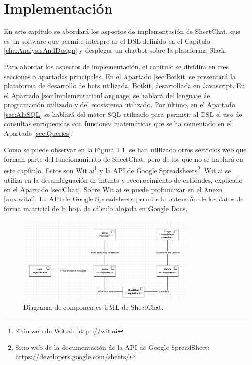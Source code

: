 \chapter{Implementación}
\label{cha:Implementation}

En este capítulo se abordará los aspectos de implementación de SheetChat, que es un software que permite interpretar el DSL definido en el Capítulo \ref{cha:AnalysisAndDesign} y desplegar un chatbot sobre la plataforma Slack.

Para abordar los aspectos de implementación, el capítulo se dividirá en tres secciones o apartados principales. En el Apartado \ref{sec:Botkit} se presentará la plataforma de desarrollo de bots utilizada, Botkit, desarrollada en Javascript. En el Apartado \ref{sec:ImplementationLanguage} se hablará del lenguaje de programación utilizado y del ecosistema utilizado. Por último, en el Apartado \ref{sec:AlaSQL} se hablará del motor SQL utilizado para permitir al DSL el uso de consultas enriquecidas con funciones matemáticas que se ha comentado en el Apartado \ref{sec:Queries}.

Como se puede observar en la Figura \ref{fig:UMLComponents}, se han utilizado otros servicios web que forman parte del funcionamiento de SheetChat, pero de los que no se hablará en este capítulo. Estos son Wit.ai\footnote{Sitio web de Wit.ai: \url{https://wit.ai}} y la API de Google Spreadsheets\footnote{Sitio web de la documentación de la API de Google SpreadSheet: \url{https://developers.google.com/sheets/}}. Wit.ai se utiliza en la desambiguación de intents y reconocimiento de entidades, explicado en el Apartado \ref{sec:Chat}. Sobre Wit.ai se puede profundizar en el Anexo \ref{anx:witai}. La API de Google Spreadsheets permite la obtención de los datos de forma matricial de la hoja de cálculo alojada en Google Docs.

\begin{figure}[htb]
	\centering
	\includegraphics[width=0.8\textwidth]{./figs/UMLComponents.png}
	\caption{Diagrama de componentes UML de SheetChat.}
	\label{fig:UMLComponents}
\end{figure}

